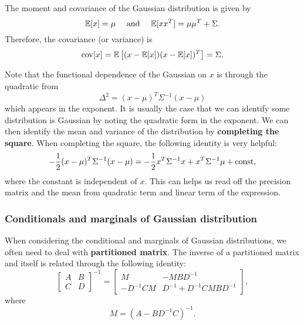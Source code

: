\documentclass[a4paper]{article}
\begin{document}
The moment and covariance of the Gaussian distribution
is given by 
\[
\mathbb{E}[x] = \mu \quad \text{ and } \quad 
\mathbb{E}[x x^T] = \mu \mu^T + \Sigma.
\]
Therefore, the covariance (or variance) is 
\[
\operatorname{cov}[x] = \mathbb{E} \left[ (x - \mathbb{E}[x]) (x - \mathbb{E}[x])^T \right]
= \Sigma.
\]

Note that the functional dependence of the Gaussian on 
$x$ is through the quadratic from
\[
\Delta^2 = (x - \mu)^T \Sigma^{-1} (x - \mu)
\]
which appears in the exponent. It is usually the case 
that we can identify some distribution is Gaussian by 
noting the quadratic form in the exponent. We can then 
identify the mean and variance of the distribution by 
\textbf{completing the square}. When completing the square,
the following identity is very helpful:
\[
- \frac{1}{2} (x - \mu)^T \Sigma^{-1} (x - \mu) 
= - \frac{1}{2} x^T \Sigma^{-1} x 
+ x^T \Sigma^{-1} \mu + \mathrm{const},
\]
where the constant is independent of $x$. This can helps 
us read off the precision matrix and the mean from quadratic
term and linear term of the expression.

\subsubsection{Conditionals and marginals of Gaussian 
distribution}

When considering the conditional and marginals of Gaussian
distributions, we often need to deal with \textbf{partitioned
matrix}. The inverse of a partitioned matrix and itself 
is related through the following identity: 
\[
\begin{bmatrix}
  A & B \\
  C & D
\end{bmatrix}^{-1} 
= 
\begin{bmatrix}
  M & - M B D^{-1} \\
  - D^{-1} C M & D^{-1} + D^{-1} C M B D^{-1}
\end{bmatrix},
\]
where 
\[
M = (A - B D^{-1} C)^{-1}.
\]
\end{document}
